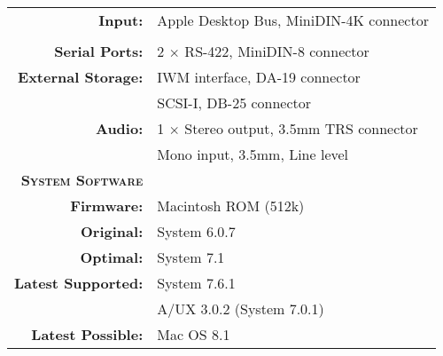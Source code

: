 \begin{tabular}{ r p{6in} }
\\
\textbf{Input:} & Apple Desktop Bus, MiniDIN-4K connector \\
\\
\textbf{Serial Ports:} & 2 \(\times\) RS-422, MiniDIN-8 connector \\
\textbf{External Storage:} & IWM interface, DA-19 connector \\
~ & SCSI-I, DB-25 connector \\
\textbf{Audio:} & 1 \(\times\) Stereo output, 3.5mm TRS connector \\
~ & Mono input, 3.5mm, Line level
\\
\textbf{\textsc{System Software}} & ~ \\
\textbf{Firmware:} & Macintosh ROM (512k) \\
\textbf{Original:} & System 6.0.7 \\
\textbf{Optimal:} & System 7.1 \\
\textbf{Latest Supported:} & System 7.6.1 \\
~ & A/UX 3.0.2 (System 7.0.1) \\
\textbf{Latest Possible:} & Mac OS 8.1 \\
\end{tabular}
